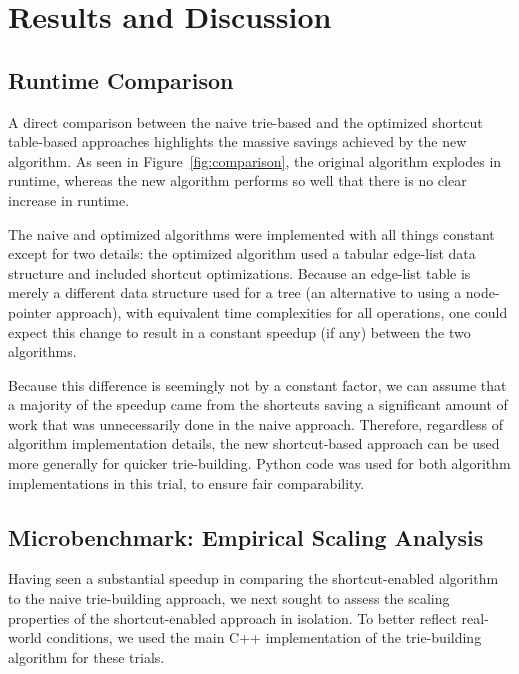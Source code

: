 \section{Results and Discussion} \label{sec:results}

\subsection{Runtime Comparison}

A direct comparison between the naive trie-based and the optimized shortcut table-based approaches highlights the massive savings achieved by the new algorithm.
As seen in Figure~\ref{fig:comparison}, the original algorithm explodes in runtime, whereas the new algorithm performs so well that there is no clear increase in runtime.



The naive and optimized algorithms were implemented with all things constant except for two details: the optimized algorithm used a tabular edge-list data structure and included shortcut optimizations.
Because an edge-list table is merely a different data structure used for a tree (an alternative to using a node-pointer approach), with equivalent time complexities for all operations, one could expect this change to result in a constant speedup (if any) between the two algorithms.

Because this difference is seemingly not by a constant factor, we can assume that a majority of the speedup came from the shortcuts saving a significant amount of work that was unnecessarily done in the naive approach.
Therefore, regardless of algorithm implementation details, the new shortcut-based approach can be used more generally for quicker trie-building.
Python code was used for both algorithm implementations in this trial, to ensure fair comparability.

\subsection{Microbenchmark: Empirical Scaling Analysis}



Having seen a substantial speedup in comparing the shortcut-enabled algorithm to the naive trie-building approach, we next sought to assess the scaling properties of the shortcut-enabled approach in isolation.
To better reflect real-world conditions, we used the main C++ implementation of the trie-building algorithm for these trials.

